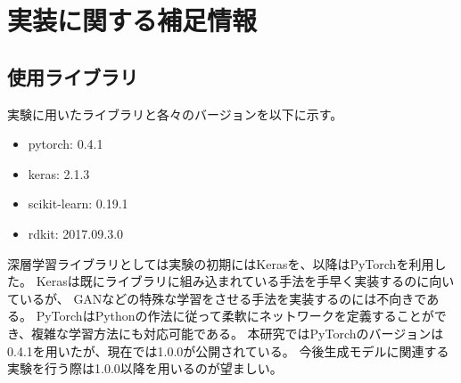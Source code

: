 \chapter{実装に関する補足情報}

\section{使用ライブラリ}

実験に用いたライブラリと各々のバージョンを以下に示す。

\begin{itemize}
    \item pytorch: 0.4.1 \cite{pytorch}
    \item keras: 2.1.3 \cite{keras}
    \item scikit-learn: 0.19.1 \cite{scikit-learn}
    \item rdkit: 2017.09.3.0 \cite{rdkit}
\end{itemize}

深層学習ライブラリとしては実験の初期にはKeras\cite{keras}を、以降はPyTorch\cite{pytorch}を利用した。
Kerasは既にライブラリに組み込まれている手法を手早く実装するのに向いているが、
GANなどの特殊な学習をさせる手法を実装するのには不向きである。
PyTorchはPythonの作法に従って柔軟にネットワークを定義することができ、複雑な学習方法にも対応可能である。
本研究ではPyTorchのバージョンは0.4.1を用いたが、現在では1.0.0が公開されている。
今後生成モデルに関連する実験を行う際は1.0.0以降を用いるのが望ましい。
